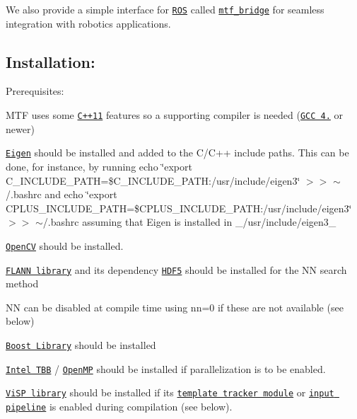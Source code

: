 We also provide a simple interface for \href{http://www.ros.org/}{\tt R\-O\-S} called \href{https://gitlab.com/vis/mtf_bridge}{\tt mtf\-\_\-bridge} for seamless integration with robotics applications.

\subsection*{Installation\-: }


\begin{DoxyItemize}
\item Prerequisites\-:
\begin{DoxyItemize}
\item M\-T\-F uses some \href{https://en.wikipedia.org/wiki/C%2B%2B11}{\tt C++11} features so a supporting compiler is needed (\href{https://gcc.gnu.org/projects/cxx0x.html}{\tt G\-C\-C 4.\-7} or newer)
\item \href{http://eigen.tuxfamily.org/index.php?title=Main_Page}{\tt Eigen} should be installed and added to the C/\-C++ include paths. This can be done, for instance, by running {\ttfamily echo \char`\"{}export C\-\_\-\-I\-N\-C\-L\-U\-D\-E\-\_\-\-P\-A\-T\-H=\$\-C\-\_\-\-I\-N\-C\-L\-U\-D\-E\-\_\-\-P\-A\-T\-H\-:/usr/include/eigen3\char`\"{} $>$$>$ $\sim$/.bashrc} and {\ttfamily echo \char`\"{}export C\-P\-L\-U\-S\-\_\-\-I\-N\-C\-L\-U\-D\-E\-\_\-\-P\-A\-T\-H=\$\-C\-P\-L\-U\-S\-\_\-\-I\-N\-C\-L\-U\-D\-E\-\_\-\-P\-A\-T\-H\-:/usr/include/eigen3\char`\"{} $>$$>$ $\sim$/.bashrc} assuming that Eigen is installed in \-\_\-/usr/include/eigen3\-\_\-
\item \href{http://opencv.org/}{\tt Open\-C\-V} should be installed.
\item \href{http://www.cs.ubc.ca/research/flann/}{\tt F\-L\-A\-N\-N library} and its dependency \href{https://www.hdfgroup.org/HDF5/release/obtain5.html}{\tt H\-D\-F5} should be installed for the N\-N search method
\begin{DoxyItemize}
\item N\-N can be disabled at compile time using nn=0 if these are not available (see below)
\end{DoxyItemize}
\item \href{http://www.boost.org/}{\tt Boost Library} should be installed
\item \href{https://www.threadingbuildingblocks.org/}{\tt Intel T\-B\-B} / \href{http://openmp.org/wp/}{\tt Open\-M\-P} should be installed if parallelization is to be enabled.
\item \href{https://visp.inria.fr/}{\tt Vi\-S\-P library} should be installed if its \href{https://visp.inria.fr/template-tracking/}{\tt template tracker module} or \href{http://visp-doc.inria.fr/doxygen/visp-3.0.0/group__group__io__video.html}{\tt input pipeline} is enabled during compilation (see below).

\end{DoxyItemize}
\end{DoxyItemize}
